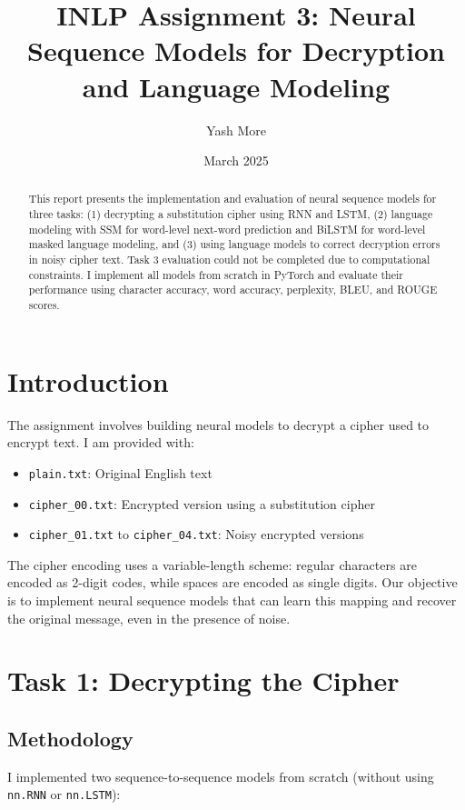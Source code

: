 \documentclass[12pt]{article}
\title{\textbf{INLP Assignment 3: Neural Sequence Models for Decryption and Language Modeling}}
\author{Yash More}
\date{March 2025}
\begin{document}
\maketitle

\begin{abstract}
This report presents the implementation and evaluation of neural sequence models for three tasks: (1) decrypting a substitution cipher using RNN and LSTM, (2) language modeling with SSM for word-level next-word prediction and BiLSTM for word-level masked language modeling, and (3) using language models to correct decryption errors in noisy cipher text. Task 3 evaluation could not be completed due to computational constraints. I implement all models from scratch in PyTorch and evaluate their performance using character accuracy, word accuracy, perplexity, BLEU, and ROUGE scores.
\end{abstract}

\section{Introduction}

The assignment involves building neural models to decrypt a cipher used to encrypt text. I am provided with:
\begin{itemize}
    \item \texttt{plain.txt}: Original English text
    \item \texttt{cipher\_00.txt}: Encrypted version using a substitution cipher
    \item \texttt{cipher\_01.txt} to \texttt{cipher\_04.txt}: Noisy encrypted versions
\end{itemize}

The cipher encoding uses a variable-length scheme: regular characters are encoded as 2-digit codes, while spaces are encoded as single digits. Our objective is to implement neural sequence models that can learn this mapping and recover the original message, even in the presence of noise.

\section{Task 1: Decrypting the Cipher}

\subsection{Methodology}

I implemented two sequence-to-sequence models from scratch (without using \texttt{nn.RNN} or \texttt{nn.LSTM}):
\end{document}
